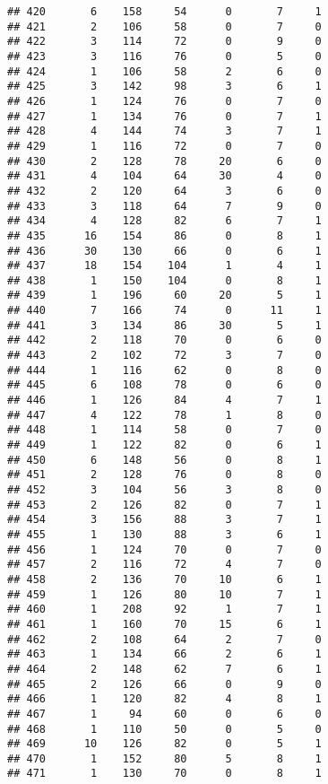 \documentclass[
]{article}
\begin{document}
\begin{verbatim}
## 420       6    158     54      0       7     1
## 421       2    106     58      0       7     0
## 422       3    114     72      0       9     0
## 423       3    116     76      0       5     0
## 424       1    106     58      2       6     0
## 425       3    142     98      3       6     1
## 426       1    124     76      0       7     0
## 427       1    134     76      0       7     1
## 428       4    144     74      3       7     1
## 429       1    116     72      0       7     0
## 430       2    128     78     20       6     0
## 431       4    104     64     30       4     0
## 432       2    120     64      3       6     0
## 433       3    118     64      7       9     0
## 434       4    128     82      6       7     1
## 435      16    154     86      0       8     1
## 436      30    130     66      0       6     1
## 437      18    154    104      1       4     1
## 438       1    150    104      0       8     1
## 439       1    196     60     20       5     1
## 440       7    166     74      0      11     1
## 441       3    134     86     30       5     1
## 442       2    118     70      0       6     0
## 443       2    102     72      3       7     0
## 444       1    116     62      0       8     0
## 445       6    108     78      0       6     0
## 446       1    126     84      4       7     1
## 447       4    122     78      1       8     0
## 448       1    114     58      0       7     0
## 449       1    122     82      0       6     1
## 450       6    148     56      0       8     1
## 451       2    128     76      0       8     0
## 452       3    104     56      3       8     0
## 453       2    126     82      0       7     1
## 454       3    156     88      3       7     1
## 455       1    130     88      3       6     1
## 456       1    124     70      0       7     0
## 457       2    116     72      4       7     0
## 458       2    136     70     10       6     1
## 459       1    126     80     10       7     1
## 460       1    208     92      1       7     1
## 461       1    160     70     15       6     1
## 462       2    108     64      2       7     0
## 463       1    134     66      2       6     1
## 464       2    148     62      7       6     1
## 465       2    126     66      0       9     0
## 466       1    120     82      4       8     1
## 467       1     94     60      0       6     0
## 468       1    110     50      0       5     0
## 469      10    126     82      0       5     1
## 470       1    152     80      5       8     1
## 471       1    130     70      0       8     1

\end{verbatim}
\end{document}

